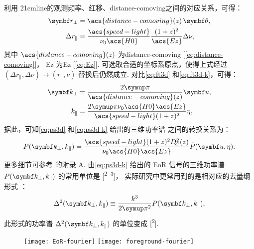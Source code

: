利用 \ac{21cmline}的观测频率、红移、\acl{distance-comoving}之间的对应关系，可得：
\begin{align}
  \B{r}_{\bot} & = \acs{distance-comoving}(z) \,\B{\theta} , \\
  \Delta r_{\parallel}
    & = \frac{\acs{speed-light}}{\nu_0 \acs{H0}}
      \frac{(1+z)^2}{\acs{Ez}} \Delta \nu ,
\end{align}
其中 $\acs{distance-comoving}(z)$ 为\acl{distance-comoving}
[\autoref{eq:distance-comoving}]，
\acs{Ez} 为\acl{Ez} [\autoref{eq:Ez}].
可选取合适的坐标系原点，使得上式经过
$(\Delta r_{\parallel}, \Delta\nu) \to (r_{\parallel}, \nu)$
替换后仍然成立.
对比\autoref{eq:ft3d} 和\autoref{eq:ft3d-k}，可得：
\begin{align}
  \B{k}_{\bot} & = \frac{2\Cpi}{\acs{distance-comoving}(z)} \B{u} , \\
  k_{\parallel} & =
    \frac{2\Cpi \nu_0 \acs{H0}\acs{Ez}}{\acs{speed-light} (1+z)^2} \eta ,
\end{align}
据此，可知\autoref{eq:ps3d} 和\autoref{eq:ps3d-k} 给出的三维功率谱
之间的转换关系为：
\begin{equation}
  P(\B{k}_{\bot}, k_{\parallel}) =
    \frac{\acs{speed-light} (1+z)^2 D_{\!C}^2(z)}{\nu_0 \acs{H0}\acs{Ez}}
    \bar{P}(\B{u}, \eta) .
\end{equation}
更多细节可参考  的附录 A.
由\autoref{eq:ps3d-k} 给出的 EoR 信号的三维功率谱
$P(\B{k}_{\bot}, k_{\parallel})$ 的常用单位是 [\si{\mK\squared\Mpc\cubed}]，
实际研究中更常用到的是相对应的去量纲形式 \cite{peacock1996}：
\begin{equation}
  \label{eq:ps3d-k2}
  \Delta^2(\B{k}_{\bot}, k_{\parallel})
    \equiv \frac{k^3}{2\Cpi^2} P(\B{k}_{\bot}, k_{\parallel}) ,
\end{equation}
此形式的功率谱 $\Delta^2(\B{k}_{\bot}, k_{\parallel})$
的单位变成 [\si{\mK\squared}].

\begin{figure}[tbp]
  \centering
  \texttt{[image: EoR-fourier]}%
  \texttt{[image: foreground-fourier]}
  \label{fig:eor-fg-fourier}
\end{figure}


